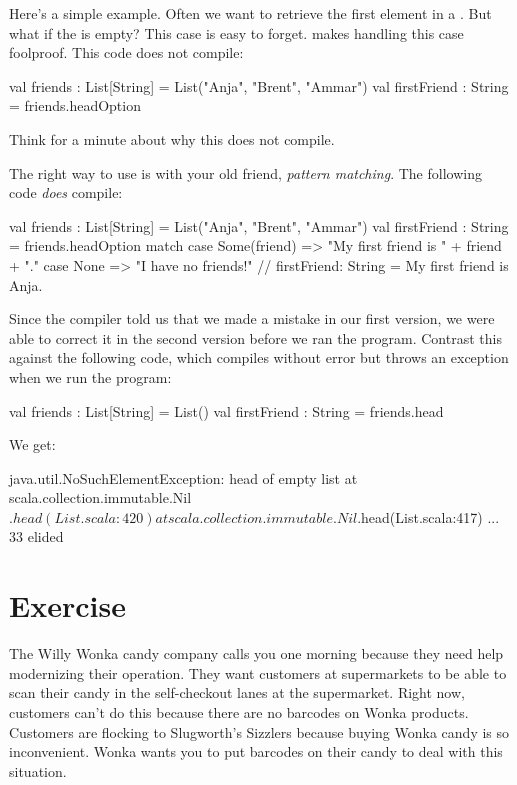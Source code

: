\documentclass{book}
\begin{document}
Here's a simple example.  Often we want to retrieve the first element in a .  But what if the  is empty?  This case is easy to forget.   makes handling this case foolproof.  This code does not compile:

\begin{scalacode}
val friends : List[String] = List("Anja", "Brent", "Ammar")
val firstFriend : String = friends.headOption
\end{scalacode}

Think for a minute about why this does not compile.

The right way to use  is with your old friend, \emph{pattern matching}.  The following code \emph{does} compile:

\begin{scalacode}
val friends : List[String] = List("Anja", "Brent", "Ammar")
val firstFriend : String = friends.headOption match {
  case Some(friend) => "My first friend is " + friend + "."
  case None => "I have no friends!"
}
// firstFriend: String = My first friend is Anja.
\end{scalacode}

Since the compiler told us that we made a mistake in our first version, we were able to correct it in the second version before we ran the program.  Contrast this against the following code, which compiles without error but throws an exception when we run the program:

\begin{scalacode}
val friends : List[String] = List()
val firstFriend : String = friends.head
\end{scalacode}

We get:

\begin{scalacode}
java.util.NoSuchElementException: head of empty list
  at scala.collection.immutable.Nil$.head(List.scala:420)
  at scala.collection.immutable.Nil$.head(List.scala:417)
  ... 33 elided
\end{scalacode}

\section{Exercise}

The Willy Wonka candy company calls you one morning because they need help modernizing their operation.  They want customers at supermarkets to be able to scan their candy in the self-checkout lanes at the supermarket.  Right now, customers can't do this because there are no barcodes on Wonka products.  Customers are flocking to Slugworth's Sizzlers because buying Wonka candy is so inconvenient.  Wonka wants you to put barcodes on their candy to deal with this situation.
\end{document}

